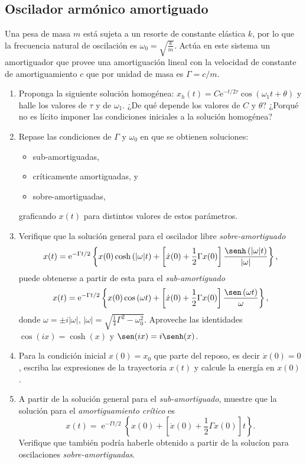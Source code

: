 \subsection*{Oscilador armónico amortiguado}

\item Una pesa de masa $m$ está sujeta a un resorte de constante elástica $k$, por lo que la frecuencia natural de oscilación es $\omega_0 = \sqrt{ \frac{k}{m} }$.
Actúa en este sistema un amortiguador que provee una amortiguación lineal con la velocidad de constante de amortiguamiento \(c\) que por unidad de masa es $\Gamma= c/m$.
	\begin{enumerate}
	\item Proponga la siguiente solución homogénea: $x_h(t) = C\mathrm{e}^{-t/2\tau}\cos(\omega_1 t + \theta )$ y halle los valores de $\tau$ y de $\omega_1$.
	¿De qué depende los valores de $C$ y $\theta$?
	¿Porqué no es lícito imponer las condiciones iniciales a la solución homogénea?
	\item Repase las condiciones de \(\Gamma\) y \(\omega_0\) en que se obtienen soluciones:
	\begin{itemize}
		\item sub-amortiguadas,
		\item críticamente amortiguadas, y
		\item sobre-amortiguadas,
	\end{itemize} \label{subamortiguado}
	graficando \(x(t)\) para distintos valores de estos parámetros.
	\item Verifique que la solución general para el oscilador libre \emph{sobre-amortiguado}
	\[
		x(t) = \operatorname{e}^{-\Gamma t/2} \left\{ x(0) \cosh \left( |\omega| t \right) + \left[ \dot{x}(0) + \frac{1}{2} \Gamma x(0) \right] \frac{ \senh \left( |\omega| t \right) }{ |\omega| } \right\}, 
	\]
	puede obtenerse a partir de esta para el \emph{sub-amortiguado}
	\[
		x(t) = \operatorname{e}^{-\Gamma t/2} \left\{ x(0) \cos \left( \omega t \right) + \left[ \dot{x}(0) + \frac{1}{2} \Gamma x(0) \right] \frac{ \sen \left( \omega t \right)}{ \omega } \right\}, 
	\]
	donde \(
		\omega = \pm i |\omega|
	\), \(
		|\omega| = \sqrt{\frac{1}{4}\Gamma^{2}-\omega_{0}^{2}}.
	\)
	Aproveche las identidades $\cos( i x ) = \cosh(x)$ y $\sen( i x ) = i \senh(x)$.
	\item Para la condición inicial \(x(0)= x_0\) que parte del reposo, es decir \(\dot{x}(0) = 0\), escriba las expresiones de la trayectoria \(x(t)\) y calcule la energía en \(x(0)\). 
	\item A partir de la solución general para el \emph{sub-amortiguado}, muestre que la solución para el \emph{amortiguamiento crítico} es
	\[
		x(t) = \operatorname{e}^{- \Gamma t / 2} \left\{ x(0) + \left[ \dot{x} (0) + \frac{1}{2} \Gamma x(0) \right] t \right\}.
		\]
	Verifique que también podría haberle obtenido a partir de la solucíon para oscilaciones \emph{sobre-amortiguadas}.
\end{enumerate}


